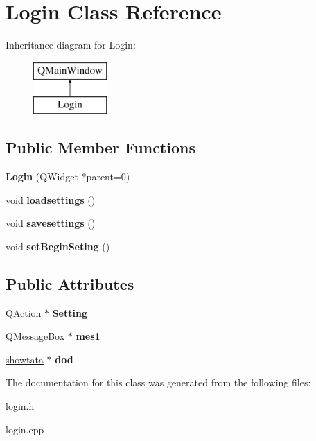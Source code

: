 \hypertarget{class_login}{}\section{Login Class Reference}
\label{class_login}
Inheritance diagram for Login\+:\begin{figure}[H]
\begin{center}
\leavevmode
\includegraphics[height=2.000000cm]{class_login}
\end{center}
\end{figure}
\subsection*{Public Member Functions}
\begin{DoxyCompactItemize}
\item 
\hypertarget{class_login_a021ebcfd29b2a30e3f5c5bbb36589381}{}\label{class_login_a021ebcfd29b2a30e3f5c5bbb36589381} 
{\bfseries Login} (Q\+Widget $\ast$parent=0)
\item 
\hypertarget{class_login_ad6a6b037140e8823d1b290cbcfeb2087}{}\label{class_login_ad6a6b037140e8823d1b290cbcfeb2087} 
void {\bfseries loadsettings} ()
\item 
\hypertarget{class_login_aac2415f9743fe56e19c5488fabf4aaba}{}\label{class_login_aac2415f9743fe56e19c5488fabf4aaba} 
void {\bfseries savesettings} ()
\item 
\hypertarget{class_login_a5060f9bd0638df8820f80ecde59c801f}{}\label{class_login_a5060f9bd0638df8820f80ecde59c801f} 
void {\bfseries set\+Begin\+Seting} ()
\end{DoxyCompactItemize}
\subsection*{Public Attributes}
\begin{DoxyCompactItemize}
\item 
\hypertarget{class_login_abce86097d9ef88afec2a110333e3a67f}{}\label{class_login_abce86097d9ef88afec2a110333e3a67f} 
Q\+Action $\ast$ {\bfseries Setting}
\item 
\hypertarget{class_login_ab5de28cc29b75a2c879f5ac098ee29bf}{}\label{class_login_ab5de28cc29b75a2c879f5ac098ee29bf} 
Q\+Message\+Box $\ast$ {\bfseries mes1}
\item 
\hypertarget{class_login_aa11e4726a5ccbf70579403d4542c42ad}{}\label{class_login_aa11e4726a5ccbf70579403d4542c42ad} 
\hyperlink{classshowtata}{showtata} $\ast$ {\bfseries dod}
\end{DoxyCompactItemize}


The documentation for this class was generated from the following files\+:\begin{DoxyCompactItemize}
\item 
login.\+h\item 
login.\+cpp\end{DoxyCompactItemize}
